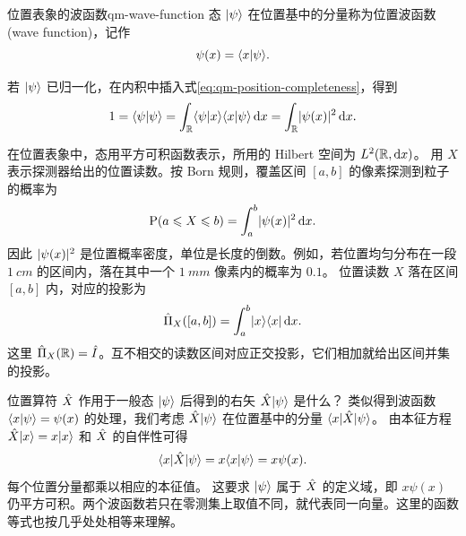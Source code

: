 \begin{definition}{位置表象的波函数}{qm-wave-function}
    态 $\lvert\psi\rangle$ 在位置基中的分量称为位置波函数(wave function)，记作
    \begin{equation}\label{eq:qm-position-wavefunction}
        \psi(x) = \langle x\vert\psi\rangle.
    \end{equation}
\end{definition}

\begin{corollary}[波函数的归一化]
    若 $\lvert\psi\rangle$ 已归一化，在内积中插入式\eqref{eq:qm-position-completeness}，得到
    \begin{equation}\label{eq:qm-position-normalization}
        1 = \langle\psi\vert\psi\rangle
        = \int_{\mathbb{R}} \langle\psi\vert x\rangle\langle x\vert\psi\rangle\mathop{}\!\mathrm{d} x
        = \int_{\mathbb{R}} \lvert\psi(x)\rvert^2\mathop{}\!\mathrm{d} x .
    \end{equation}
\end{corollary}

在位置表象中，态用平方可积函数表示，所用的 Hilbert 空间为 $L^2(\mathbb{R},\mathop{}\!\mathrm{d} x)$。
用 $X$ 表示探测器给出的位置读数。按 Born 规则，覆盖区间 $[a,b]$ 的像素探测到粒子的概率为
\begin{equation}\label{eq:qm-position-interval-probability}
    \operatorname{P}(a \leqslant X \leqslant b) = \int_a^b\lvert\psi(x)\rvert^2\mathop{}\!\mathrm{d} x .
\end{equation}
因此 $\lvert\psi(x)\rvert^2$ 是位置概率密度，单位是长度的倒数。例如，若位置均匀分布在一段 $\qty{1}{cm}$ 的区间内，落在其中一个 $\qty{1}{mm}$ 像素内的概率为 $0.1$。
位置读数 $X$ 落在区间 $[a,b]$ 内，对应的投影为
\begin{equation}\label{eq:qm-position-spectral-projection}
    \hat{\Pi}_X([a,b]) = \int_a^b\lvert x\rangle\langle x\rvert\mathop{}\!\mathrm{d} x .
\end{equation}
这里 $\hat{\Pi}_X(\mathbb{R}) = \hat{I}$。互不相交的读数区间对应正交投影，它们相加就给出区间并集的投影。

位置算符 $\hat{X}$ 作用于一般态 $\lvert\psi\rangle$ 后得到的右矢 $\hat{X}\lvert\psi\rangle$ 是什么？
类似得到波函数 $\langle x\vert\psi\rangle = \psi(x)$ 的处理，我们考虑 $\hat{X}\lvert\psi\rangle$ 在位置基中的分量 $\langle x\vert\hat{X}\vert\psi\rangle$。
由本征方程 $\hat{X}\lvert x\rangle = x\lvert x\rangle$ 和 $\hat{X}$ 的自伴性可得
\begin{equation}
    \langle x\vert\hat{X}\vert\psi\rangle = x\langle x\vert\psi\rangle = x\psi(x).
\end{equation}
每个位置分量都乘以相应的本征值。
这要求 $\lvert\psi\rangle$ 属于 $\hat{X}$ 的定义域，即 $x\psi(x)$ 仍平方可积。两个波函数若只在零测集上取值不同，就代表同一向量。这里的函数等式也按几乎处处相等来理解。


